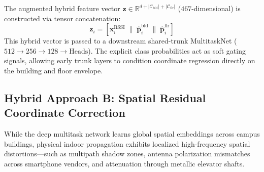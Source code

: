 The augmented hybrid feature vector $\mathbf{z} \in \mathbb{R}^{d + |\mathcal{C}_{\text{bld}}| + |\mathcal{C}_{\text{flr}}|}$ ($467$-dimensional) is constructed via tensor concatenation:
\begin{equation}
\label{eq:stacked-feature}
\mathbf{z}_i = \left[ \mathbf{x}_i^{\text{RSSI}} \;\|\; \hat{\mathbf{p}}_i^{\text{bld}} \;\|\; \hat{\mathbf{p}}_i^{\text{flr}} \right]
\end{equation}
This hybrid vector is passed to a downstream shared-trunk MultitaskNet ($512 \to 256 \to 128 \to \text{Heads}$). The explicit class probabilities act as soft gating signals, allowing early trunk layers to condition coordinate regression directly on the building and floor envelope.

\subsection{Hybrid Approach B: Spatial Residual Coordinate Correction}
\label{subsec:residual}

While the deep multitask network learns global spatial embeddings across campus buildings, physical indoor propagation exhibits localized high-frequency spatial distortions—such as multipath shadow zones, antenna polarization mismatches across smartphone vendors, and attenuation through metallic elevator shafts.

